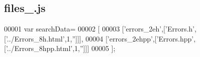 \subsection{files\+\_.\+js}
\label{files__2_8js_source}

\begin{DoxyCode}
00001 var searchData=
00002 [
00003   [\textcolor{stringliteral}{'errors\_2eh'},[\textcolor{stringliteral}{'Errors.h'},[\textcolor{stringliteral}{'../Errors\_8h.html'},1,\textcolor{stringliteral}{''}]]],
00004   [\textcolor{stringliteral}{'errors\_2ehpp'},[\textcolor{stringliteral}{'Errors.hpp'},[\textcolor{stringliteral}{'../Errors\_8hpp.html'},1,\textcolor{stringliteral}{''}]]]
00005 ];
\end{DoxyCode}
